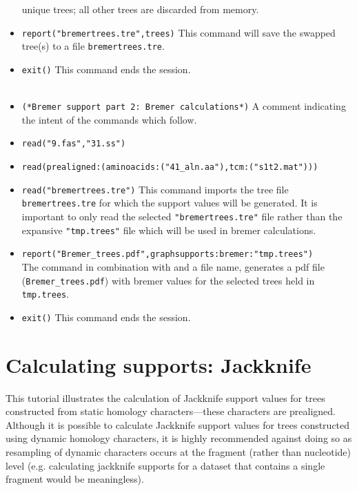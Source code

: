 \begin{itemize}
 unique trees; all other trees are discarded from memory. 
\item \texttt{report("bremertrees.tre",trees)} This command will save the swapped tree(s) to a file 
\texttt{bremertrees.tre}. 
\item \texttt{exit()} This command ends the \poy session.
\\
\\
\item \texttt{(*Bremer support part 2: Bremer calculations*)}  A comment indicating the intent of the commands 
which follow.
\item \texttt{read("9.fas","31.ss")}
\item \texttt{read(prealigned:(aminoacids:("41\_aln.aa"),tcm:("s1t2.mat")))}
\item \texttt{read("bremertrees.tre")} This command imports the tree file \\ \texttt{bremertrees.tre} for which the support 
values will be generated.  It is important to only read the selected \texttt{"bremertrees.tre"} file rather than the 
expansive \texttt{"tmp.trees"} file which will be used in bremer calculations.
\item \texttt{report("Bremer\_trees.pdf",graphsupports:bremer:"tmp.trees")} \\The {} command 
in combination with  and a file name, generates a pdf file (\texttt{Bremer\_trees.pdf}) 
with bremer values for the selected trees held in \texttt{tmp.trees}.  
\item \texttt{exit()} This command ends the \poy session.
\end{itemize}


\section{Calculating supports: Jackknife}{\label{tutorial5}}

This tutorial illustrates the calculation of Jackknife support values for trees constructed from static homology 
characters---these characters are prealigned.  Although it is possible to calculate Jackknife support values for 
trees constructed using dynamic homology characters, it is highly recommended against doing so as resampling 
of dynamic characters occurs at the fragment (rather than nucleotide) level (e.g. calculating jackknife supports for 
a dataset that contains a single fragment would be meaningless). 

